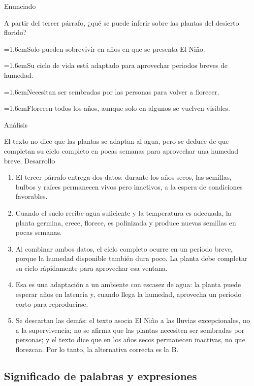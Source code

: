 \documentclass[10pt,a4paper,twocolumn]{article}
\newcommand{\alternativa}[2]{\par\noindent\hangindent=1.6em\hangafter=1\makebox[1.6em][l]{\tecla{#1}}#2\par}
\newcommand{\clave}[1]{\par\smallskip{\sffamily\footnotesize\color{esmeralda} Clave \teclaok{#1}}\par}
\begin{document}
\begin{ejemplo}
{\sffamily\footnotesize\color{zinc500} Enunciado}\par
A partir del tercer párrafo, ¿qué se puede inferir sobre las plantas del desierto florido?
\alternativa{A}{Solo pueden sobrevivir en años en que se presenta El Niño.}
\alternativa{B}{Su ciclo de vida está adaptado para aprovechar periodos breves de humedad.}
\alternativa{C}{Necesitan ser sembradas por las personas para volver a florecer.}
\alternativa{D}{Florecen todos los años, aunque solo en algunos se vuelven visibles.}
\clave{B}
{\sffamily\footnotesize\color{zinc500} Análisis}\par El texto no dice que las plantas se adaptan al agua, pero se deduce de que completan su ciclo completo en pocas semanas para aprovechar una humedad breve.
{\sffamily\footnotesize\color{zinc500} Desarrollo}
\begin{enumerate}
  \item El tercer párrafo entrega dos datos: durante los años secos, las semillas, bulbos y raíces permanecen vivos pero inactivos, a la espera de condiciones favorables.
  \item Cuando el suelo recibe agua suficiente y la temperatura es adecuada, la planta germina, crece, florece, es polinizada y produce nuevas semillas en pocas semanas.
  \item Al combinar ambos datos, el ciclo completo ocurre en un periodo breve, porque la humedad disponible también dura poco. La planta debe completar su ciclo rápidamente para aprovechar esa ventana.
  \item Esa es una adaptación a un ambiente con escasez de agua: la planta puede esperar años en latencia y, cuando llega la humedad, aprovecha un periodo corto para reproducirse.
  \item Se descartan las demás: el texto asocia El Niño a las lluvias excepcionales, no a la supervivencia; no se afirma que las plantas necesiten ser sembradas por personas; y el texto dice que en los años secos permanecen inactivas, no que florezcan. Por lo tanto, la alternativa correcta es la B.
\end{enumerate}
\end{ejemplo}

\subsection{Significado de palabras y expresiones}
\end{document}
